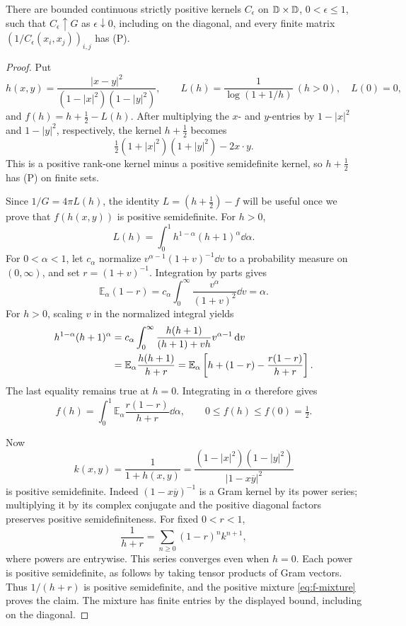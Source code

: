 \begin{lemma}\label{lem:regularization}
There are bounded continuous strictly positive kernels $C_\epsilon$ on $\mathbb D\times\mathbb D$, $0<\epsilon\le1$, such that $C_\epsilon\uparrow G$ as $\epsilon\downarrow0$, including on the diagonal, and every finite matrix $(1/C_\epsilon(x_i,x_j))_{i,j}$ has \textup{(P)}.
\end{lemma}
\begin{proof}
Put
\[
h(x,y)=\frac{|x-y|^2}{(1-|x|^2)(1-|y|^2)},\qquad
L(h)=\frac1{\log(1+1/h)}\ (h>0),\quad L(0)=0,
\]
and $f(h)=h+\tfrac12-L(h)$. After multiplying the $x$- and $y$-entries by $1-|x|^2$ and $1-|y|^2$, respectively, the kernel $h+\tfrac12$ becomes
\begin{equation}\label{eq:lorentz}
\tfrac12(1+|x|^2)(1+|y|^2)-2x\cdot y.
\end{equation}
This is a positive rank-one kernel minus a positive semidefinite kernel, so $h+\tfrac12$ has \textup{(P)} on finite sets.

Since $1/G=4\pi L(h)$, the identity $L=(h+\tfrac12)-f$ will be useful once we prove that $f(h(x,y))$ is positive semidefinite. For $h>0$,
\begin{equation}\label{eq:log-mean}
L(h)=\int_0^1h^{1-\alpha}(h+1)^\alpha\dd\alpha.
\end{equation}
For $0<\alpha<1$, let $c_\alpha$ normalize $v^{\alpha-1}(1+v)^{-1}\dd v$ to a probability measure on $(0,\infty)$, and set $r=(1+v)^{-1}$. Integration by parts gives
\[
\mathbb E_\alpha(1-r)
=c_\alpha\int_0^\infty\frac{v^\alpha}{(1+v)^2}\dd v
=\alpha.
\]
For $h>0$, scaling $v$ in the normalized integral yields
\begin{align}
h^{1-\alpha}(h+1)^\alpha
&=c_\alpha\int_0^\infty
\frac{h(h+1)}{(h+1)+vh}v^{\alpha-1}\,\mathrm d v\notag\\
&=\mathbb E_\alpha\frac{h(h+1)}{h+r}
=\mathbb E_\alpha\left[h+(1-r)-\frac{r(1-r)}{h+r}\right].\label{eq:mixture-algebra}
\end{align}
The last equality remains true at $h=0$. Integrating in $\alpha$ therefore gives
\begin{equation}\label{eq:f-mixture}
f(h)=\int_0^1\mathbb E_\alpha\frac{r(1-r)}{h+r}\dd\alpha,
\qquad 0\le f(h)\le f(0)=\tfrac12.
\end{equation}

Now
\[
k(x,y)=\frac1{1+h(x,y)}
=\frac{(1-|x|^2)(1-|y|^2)}{|1-x\overline y|^2}
\]
is positive semidefinite. Indeed $(1-x\overline y)^{-1}$ is a Gram kernel by its power series; multiplying it by its complex conjugate and the positive diagonal factors preserves positive semidefiniteness. For fixed $0<r<1$,
\begin{equation}\label{eq:schur-geometric}
\frac1{h+r}=\sum_{n\ge0}(1-r)^n k^{n+1},
\end{equation}
where powers are entrywise. This series converges even when $h=0$. Each power is positive semidefinite, as follows by taking tensor products of Gram vectors. Thus $1/(h+r)$ is positive semidefinite, and the positive mixture \eqref{eq:f-mixture} proves the claim. The mixture has finite entries by the displayed bound, including on the diagonal.


\end{proof}
